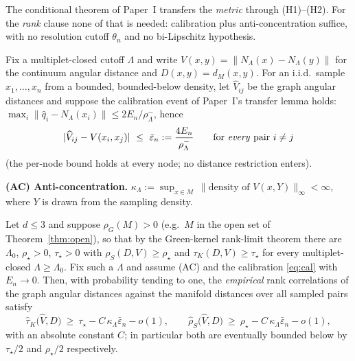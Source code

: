 The conditional theorem of Paper~I transfers the \emph{metric} through (H1)--(H2). For
the \emph{rank} clause none of that is needed: calibration plus anti-concentration
suffice, with no resolution cutoff $\theta_n$ and no bi-Lipschitz hypothesis.

Fix a multiplet-closed cutoff $\Lambda$ and write
$V(x,y)=\lVert N_\Lambda(x)-N_\Lambda(y)\rVert$ for the continuum angular distance and
$D(x,y)=d_M(x,y)$. For an i.i.d.\ sample $x_1,\dots,x_n$ from a bounded, bounded-below
density, let $\widehat V_{ij}$ be the graph angular distances and suppose the
calibration event of Paper~I's transfer lemma holds:
$\max_i\lVert\hat q_i-N_\Lambda(x_i)\rVert\le2E_n/\rho^-_\Lambda$, hence
\begin{equation}\label{eq:cal}
\lvert\widehat V_{ij}-V(x_i,x_j)\rvert\ \le\ \bar\varepsilon_n:=\frac{4E_n}{\rho^-_\Lambda}
\qquad\text{for \emph{every} pair } i\ne j
\end{equation}
(the per-node bound holds at every node; no distance restriction enters).

\smallskip
\noindent\textbf{(AC) Anti-concentration.} $\displaystyle
\kappa_\Lambda:=\sup_{x\in M}\ \bigl\lVert\text{density of } V(x,Y)\bigr\rVert_\infty<\infty$,
where $Y$ is drawn from the sampling density.

\begin{theorem}\label{thm:ac-transfer}
Let $d\le3$ and suppose $\rho_G(M)>0$ (e.g.\ $M$ in the open set of
Theorem~\ref{thm:open}), so that by the Green-kernel rank-limit theorem there are
$\Lambda_0$, $\rho_\star>0$, $\tau_\star>0$ with
$\rho_S(D,V)\ge\rho_\star$ and $\tau_K(D,V)\ge\tau_\star$ for every multiplet-closed
$\Lambda\ge\Lambda_0$. Fix such a $\Lambda$ and assume (AC) and the calibration
\eqref{eq:cal} with $E_n\to0$. Then, with probability tending to one, the
\emph{empirical} rank correlations of the graph angular distances against the manifold
distances over all sampled pairs satisfy
\[
\widehat\tau_K\bigl(\widehat V,D\bigr)\ \ge\ \tau_\star-C\,\kappa_\Lambda\bar\varepsilon_n-o(1),
\qquad
\widehat\rho_S\bigl(\widehat V,D\bigr)\ \ge\ \rho_\star-C\,\kappa_\Lambda\bar\varepsilon_n-o(1),
\]
with an absolute constant $C$; in particular both are eventually bounded below by
$\tau_\star/2$ and $\rho_\star/2$ respectively.
\end{theorem}

